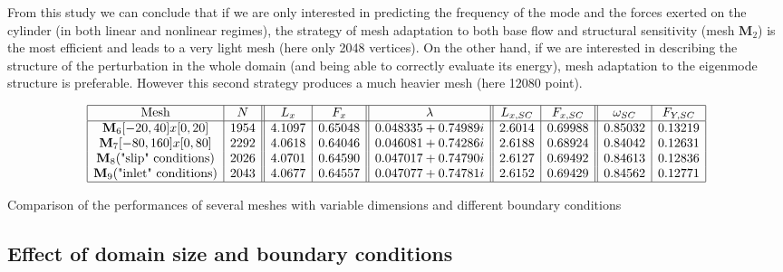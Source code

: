 \documentclass[twocolumn,10pt]{asme2ej}
\begin{document}
From this study we can conclude that if we are only interested in predicting the frequency of the mode and the forces exerted on the cylinder (in both linear and nonlinear regimes), the strategy of mesh adaptation to both base flow and structural sensitivity (mesh $\mathbf{M}_2$) is the most efficient and leads to a very light mesh (here only 2048 vertices). On the other hand, if we are interested in describing the structure of the perturbation in the whole domain (and being able to correctly evaluate its energy), mesh adaptation to the eigenmode structure is preferable. However this second strategy produces a much heavier mesh (here 12080 point).
 
 
 \begin{table*}
$$
\begin{array}{|c|c||c|c||c||c|c||c|c|}
\hline
\mbox{Mesh} & N & L_x & F_x & \lambda & L_{x,SC} & F_{x,SC} & \omega_{SC}  & F_{Y,SC} \\%
\hline
\mathbf{M}_6 [-20,40]x[0,20] 			& 1954	&  4.1097 & 0.65048 	& 0.048335+0.74989i 	& 2.6014  & 0.69988 & 0.85032 & 0.13219 \\%
\mathbf{M}_7 [-80,160]x[0,80] 			& 2292	& 4.0618 & 0.64046		& 0.046081+0.74286i 	& 2.6188 	& 0.68924 	& 0.84042 & 0.12631 \\%
\mathbf{M}_8 \mbox{("slip" conditions)}	 & 2026	& 4.0701 &0.64590		& 0.047017+0.74790i	& 2.6127 	& 0.69492		& 0.84613 & 0.12836 \\%
\mathbf{M}_9 \mbox{("inlet" conditions)}	 & 2043	& 4.0677 &0.64	557	& 0.047077+0.74781i	& 2.6152 	& 0.69429		& 0.84562  & 0.12771 \\%
\hline
\end{array}
$$
\caption{Comparison of the performances of several meshes with variable dimensions and different boundary conditions}
\label{tab:conv3}
\end{table*}






\subsection{Effect of domain size and boundary conditions}
\end{document}
